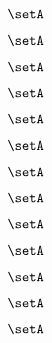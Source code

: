 \begin{forslides}
    \begin{equation}
        \label{eq:slides-translation-53}
        \setA
    \end{equation}

    \begin{equation}
        \label{eq:slides-translation-54}
        \setA
    \end{equation}

    \begin{equation}
        \label{eq:slides-translation-55}
        \setA
    \end{equation}

    \begin{equation}
        \label{eq:slides-translation-56}
        \setA
    \end{equation}

    \begin{equation}
        \label{eq:slides-translation-57}
        \setA
    \end{equation}

    \begin{equation}
        \label{eq:slides-translation-58}
        \setA
    \end{equation}

    \begin{equation}
        \label{eq:slides-translation-59}
        \setA
    \end{equation}

    \begin{equation}
        \label{eq:slides-translation-60}
        \setA
    \end{equation}

    \begin{equation}
        \label{eq:slides-translation-61}
        \setA
    \end{equation}

    \begin{equation}
        \label{eq:slides-translation-62}
        \setA
    \end{equation}

    \begin{equation}
        \label{eq:slides-translation-63}
        \setA
    \end{equation}

    \begin{equation}
        \label{eq:slides-translation-64}
        \setA
    \end{equation}

    \begin{equation}
        \label{eq:slides-translation-65}
        \setA
    \end{equation}


\end{forslides}
